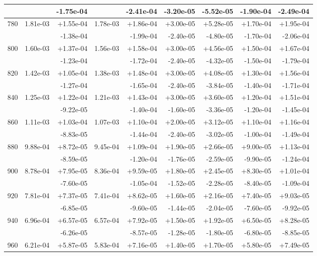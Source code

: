 \begin{tabular}{|c|r|r|r|r|r|r|r|r|}
 & & -1.75e-04 & & -2.41e-04 & -3.20e-05 & -5.52e-05 & -1.90e-04 & -2.49e-04 \\
\hline
780 & 1.81e-03 & +1.55e-04 & 1.78e-03 & +1.86e-04 & +3.00e-05 & +5.28e-05 & +1.70e-04 & +1.95e-04\\
 & & -1.38e-04 & & -1.99e-04 & -2.40e-05 & -4.80e-05 & -1.70e-04 & -2.06e-04 \\
\hline
800 & 1.60e-03 & +1.37e-04 & 1.56e-03 & +1.58e-04 & +3.00e-05 & +4.56e-05 & +1.50e-04 & +1.67e-04\\
 & & -1.23e-04 & & -1.72e-04 & -2.40e-05 & -4.32e-05 & -1.50e-04 & -1.79e-04 \\
\hline
820 & 1.42e-03 & +1.05e-04 & 1.38e-03 & +1.48e-04 & +3.00e-05 & +4.08e-05 & +1.30e-04 & +1.56e-04\\
 & & -1.27e-04 & & -1.65e-04 & -2.40e-05 & -3.84e-05 & -1.40e-04 & -1.71e-04 \\
\hline
840 & 1.25e-03 & +1.22e-04 & 1.21e-03 & +1.43e-04 & +3.00e-05 & +3.60e-05 & +1.20e-04 & +1.51e-04\\
 & & -9.22e-05 & & -1.40e-04 & -1.60e-05 & -3.36e-05 & -1.20e-04 & -1.45e-04 \\
\hline
860 & 1.11e-03 & +1.03e-04 & 1.07e-03 & +1.10e-04 & +2.00e-05 & +3.12e-05 & +1.10e-04 & +1.16e-04\\
 & & -8.83e-05 & & -1.44e-04 & -2.40e-05 & -3.02e-05 & -1.00e-04 & -1.49e-04 \\
\hline
880 & 9.88e-04 & +8.72e-05 & 9.45e-04 & +1.09e-04 & +1.90e-05 & +2.66e-05 & +9.00e-05 & +1.13e-04\\
 & & -8.59e-05 & & -1.20e-04 & -1.76e-05 & -2.59e-05 & -9.90e-05 & -1.24e-04 \\
\hline
900 & 8.78e-04 & +7.95e-05 & 8.36e-04 & +9.59e-05 & +1.80e-05 & +2.45e-05 & +8.30e-05 & +1.01e-04\\
 & & -7.60e-05 & & -1.05e-04 & -1.52e-05 & -2.28e-05 & -8.40e-05 & -1.09e-04 \\
\hline
920 & 7.81e-04 & +7.37e-05 & 7.41e-04 & +8.62e-05 & +1.60e-05 & +2.16e-05 & +7.40e-05 & +9.03e-05\\
 & & -6.85e-05 & & -9.60e-05 & -1.44e-05 & -2.04e-05 & -7.60e-05 & -9.92e-05 \\
\hline
940 & 6.96e-04 & +6.57e-05 & 6.57e-04 & +7.92e-05 & +1.50e-05 & +1.92e-05 & +6.50e-05 & +8.28e-05\\
 & & -6.26e-05 & & -8.57e-05 & -1.28e-05 & -1.80e-05 & -6.80e-05 & -8.85e-05 \\
\hline
960 & 6.21e-04 & +5.87e-05 & 5.83e-04 & +7.16e-05 & +1.40e-05 & +1.70e-05 & +5.80e-05 & +7.49e-05\\

\end{tabular}

